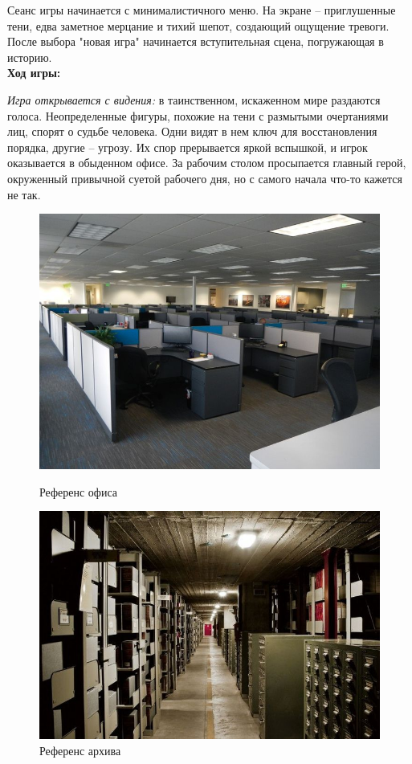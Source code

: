 \documentclass{article}
\begin{document}
	Сеанс игры начинается с минималистичного меню. На экране – приглушенные тени, едва заметное мерцание и тихий шепот, создающий ощущение тревоги. После выбора "новая игра" начинается вступительная сцена, погружающая в историю. \\
	
	\textbf{Ход игры:}
	
	\textit{Игра открывается с видения:} в таинственном, искаженном мире раздаются голоса. Неопределенные фигуры, похожие на тени с размытыми очертаниями лиц, спорят о судьбе человека. Одни видят в нем ключ для восстановления порядка, другие – угрозу. Их спор прерывается яркой вспышкой, и игрок оказывается в обыденном офисе. За рабочим столом  просыпается главный герой, окруженный привычной суетой рабочего дня, но с самого начала что-то кажется не так.
	
	\begin{figure}[h]
		\centering
		\begin{minipage}{0.45\textwidth}
			\centering
			\includegraphics[width=\textwidth]{images/officeReference.jpg}
			\caption{Референс офиса}
			\label{fig:office}
		\end{minipage}
		\hfill
		\begin{minipage}{0.45\textwidth}
			\centering
			\includegraphics[width=\textwidth]{images/archive1.jpg}
			\caption{Референс архива}
			\label{fig:archive}
		\end{minipage}
	\end{figure}
	
\end{document}

